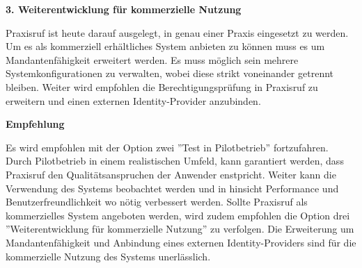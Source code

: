 \textbf{3. Weiterentwicklung für kommerzielle Nutzung}

Praxisruf ist heute darauf ausgelegt, in genau einer Praxis eingesetzt zu werden.
Um es als kommerziell erhältliches System anbieten zu können muss es um Mandantenfähigkeit erweitert werden.
Es muss möglich sein mehrere Systemkonfigurationen zu verwalten, wobei diese strikt voneinander getrennt bleiben.
Weiter wird empfohlen die Berechtigungsprüfung in Praxisruf zu erweitern und einen externen Identity-Provider anzubinden.

\textbf{Empfehlung}

Es wird empfohlen mit der Option zwei ''Test in Pilotbetrieb'' fortzufahren.
Durch Pilotbetrieb in einem realistischen Umfeld, kann garantiert werden, dass Praxisruf den Qualitätsanspruchen der Anwender enstpricht.
Weiter kann die Verwendung des Systems beobachtet werden und in hinsicht Performance und Benutzerfreundlichkeit wo nötig verbessert werden.
Sollte Praxisruf als kommerzielles System angeboten werden, wird zudem empfohlen die Option drei ''Weiterentwicklung für kommerzielle Nutzung'' zu verfolgen.
Die Erweiterung um Mandantenfähigkeit und Anbindung eines externen Identity-Providers sind für die kommerzielle Nutzung des Systems unerlässlich.

\clearpage
